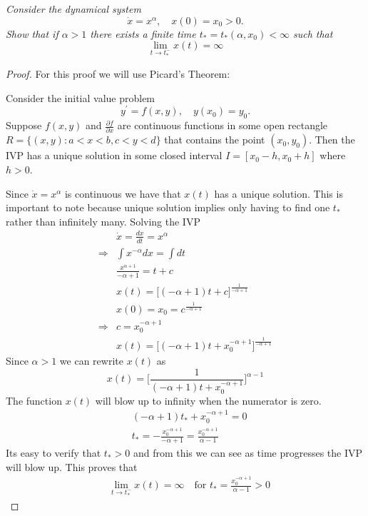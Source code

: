 \documentclass[12pt]{article}
\newenvironment{theorem}[2][]{\begin{trivlist}
 		\item[{\bfseries #1}\hskip \labelsep {\bfseries #2.}]}{\end{trivlist}}
\theoremstyle{remark}
\begin{document}
 	\textit{Consider the dynamical system}
 	$$ \dot{x} = x^\alpha, \quad x(0) = x_0 > 0. $$
 	\textit{Show that if $\alpha > 1$ there exists a finite time $t_* = t_*(\alpha, x_0) < \infty$ such that}
 	$$ \lim\limits_{t \rightarrow t_*^-} x(t) = \infty $$
 	\begin{proof} For this proof we will use Picard's Theorem:
 		\begin{theorem}{Picard's Theorem}
 			Consider the initial value problem
 			$$ y^\prime = f(x,y), \quad y(x_0) = y_0. $$
 			Suppose $f(x,y)$ and $\frac{\partial f}{\partial x}$ are continuous functions in some open rectangle $R = \{(x,y): a < x < b, c < y < d\}$ that contains the point $(x_0, y_0)$. Then the IVP has a unique solution in some closed interval $I = [x_0 - h, x_0 + h]$ where $h > 0$.
 		\end{theorem}    
 		Since $\dot{x} = x^\alpha$ is continuous we have that $x(t)$ has a unique solution. This is important to note because unique solution implies only having to find one $t_*$ rather than infinitely many. Solving the IVP
 		\begin{align*}
 		& \dot{x} = \frac{dx}{dt} = x^\alpha \\
 		\Rightarrow & \int x^{-\alpha} dx = \int dt \\
 		& \frac{x^{\alpha+1}}{-\alpha + 1} = t + c \\
 		& x(t) = \bigg[(-\alpha + 1)t + c\bigg]^{\frac{1}{-\alpha + 1}} \\
 		& x(0) = x_0 = c^{\frac{1}{-\alpha + 1}} \\
 		\Rightarrow & c = x_0^{-\alpha + 1} \\
 		& x(t) = \bigg[(-\alpha + 1)t + x_0^{-\alpha + 1}\bigg]^{\frac{1}{-\alpha + 1}}
 		\end{align*} 
 		Since $\alpha > 1$ we can rewrite $x(t)$ as
 		$$ x(t) = \bigg[\frac{1}{(-\alpha + 1)t + x_0^{-\alpha + 1}}\bigg]^{\alpha - 1} $$
 		The function $x(t)$ will blow up to infinity when the numerator is zero.
 		\begin{align*}
 		& (-\alpha + 1)t_* + x_0^{-\alpha + 1} = 0 \\
 		& t_* = -\frac{x_0^{-\alpha + 1}}{-\alpha + 1} = \frac{x_0^{-\alpha + 1}}{\alpha - 1}
 		\end{align*}
 		Its easy to verify that $t_* > 0$ and from this we can see as time progresses the IVP will blow up. This proves that 
 		\begin{align*}
 		& \lim\limits_{t \rightarrow t_*^-} x(t) = \infty \quad \text{for } t_* = \frac{x_0^{-\alpha + 1}}{\alpha - 1} > 0
 		\end{align*}
 	\end{proof}
 	
\end{document}
